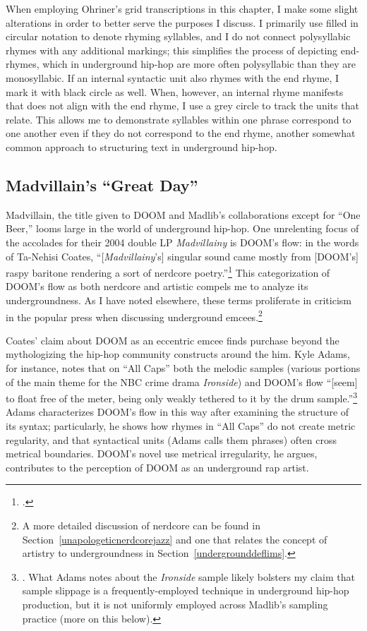 When employing Ohriner's grid transcriptions in this chapter, I make some slight alterations in order
to better serve the purposes I discuss. I primarily use filled in circular notation to denote rhyming
syllables, and I do not connect polysyllabic rhymes with any additional markings; this simplifies the
process of depicting end-rhymes, which in underground hip-hop are more often polysyllabic than they are
monosyllabic. If an internal syntactic unit also rhymes with the end rhyme, I mark it with black circle
as well. When, however, an internal rhyme manifests that does not align with the end rhyme, I use a grey
circle to track the units that relate. This allows me to demonstrate syllables within one phrase correspond
to one another even if they do not correspond to the end rhyme, another somewhat common approach to 
structuring text in underground hip-hop.

\subsection*{\centering Madvillain's ``Great Day''}

Madvillain, the title given to DOOM and Madlib's collaborations except for ``One Beer,'' looms large
in the world of underground hip-hop. One unrelenting focus of the accolades for  their 2004 double LP 
\textit{Madvillainy} is DOOM's flow: in the words of Ta-Nehisi Coates, ``[\textit{Madvillainy}'s] 
singular sound came mostly from [DOOM's] raspy baritone rendering a sort of nerdcore poetry.''\footnote{
    \cite{ta-nehisicoatesMaskDoomNonconformist2009}.}
This categorization of DOOM's flow as both nerdcore and artistic compels me to analyze its undergroundness.
As I have noted elsewhere, these terms proliferate in criticism in the popular press when discussing
underground emcees.\footnote{
    A more detailed discussion of nerdcore can be found in Section~\ref{unapologeticnerdcorejazz} and
    one that relates the concept of artistry to undergroundness in Section~\ref{undergrounddeflims}.}

Coates' claim about DOOM as an eccentric emcee finds purchase beyond the mythologizing the hip-hop community
constructs around the him. Kyle Adams, for instance, notes that on ``All Caps'' both the melodic samples (various 
portions of the main theme for the NBC crime drama \textit{Ironside}) and DOOM's flow ``[seem] to float free
of the meter, being only weakly tethered to it by the drum sample.''\footnote{
    \cite{kyleadamsMetricalTechniquesFlow2009}. What Adams notes about the \textit{Ironside} sample likely
    bolsters my claim that sample slippage is a frequently-employed technique in underground hip-hop 
    production, but it is not uniformly employed across Madlib's sampling practice (more on this below).}
Adams characterizes DOOM's flow in this way after examining the structure of its syntax; particularly, he
shows how rhymes in ``All Caps'' do not create metric regularity, and that syntactical units (Adams calls
them phrases) often cross metrical boundaries. DOOM's novel use metrical irregularity, he argues, contributes
to the perception of DOOM as an underground rap artist.

